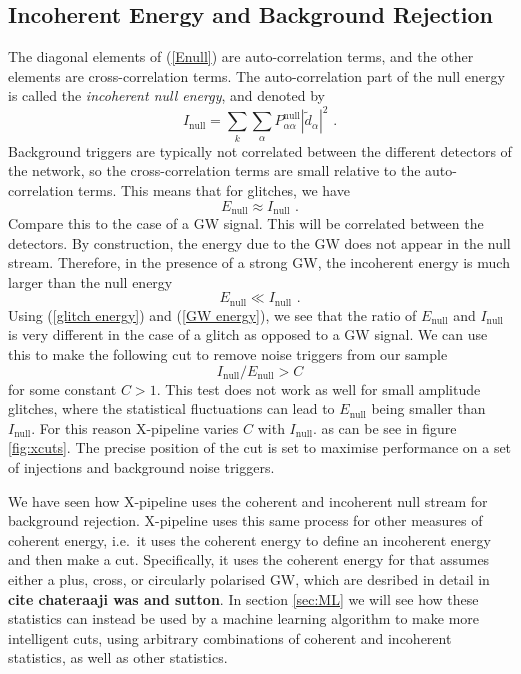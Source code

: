 \documentclass[11pt]{cuthesis}
\newcommand{\fs}{\text{ .}}
\newcommand{\xp}{X-pipeline }
\begin{document}
\subsection{Incoherent Energy and Background Rejection} \label{sec:xcuts}
The diagonal elements of (\ref{Enull}) are auto-correlation terms, and the other elements are cross-correlation terms. The auto-correlation part of the null energy is called the \textit{incoherent null energy}, and denoted by
\begin{equation}
I_\text{null} = \sum_k \sum_\alpha P^\text{null}_{\alpha \alpha} | \tilde{d}_\alpha |^2 \fs
\end{equation}
Background triggers are typically not correlated between the different detectors of the network, so the cross-correlation terms are small relative to the auto-correlation terms. This means that for glitches, we have
\begin{equation} \label{glitch energy}
E_\text{null} \approx I_\text{null} \fs
\end{equation} 
Compare this to the case of a GW signal. This will be correlated between the detectors. By construction, the energy due to the GW does not appear in the null stream. Therefore, in the presence of a strong GW, the incoherent energy is much larger than the null energy 
\begin{equation} \label{GW energy}
E_\text{null} \ll I_\text{null} \fs
\end{equation}
Using (\ref{glitch energy}) and (\ref{GW energy}), we see that the ratio of $E_\text{null}$ and $I_\text{null}$ is very different in the case of a glitch as opposed to a GW signal. We can use this to make the following cut to remove noise triggers from our sample
\begin{equation} \label{cut}
I_\text{null} / E_\text{null} > C
\end{equation}
for some constant $C>1$. This test does not work as well for small amplitude glitches, where the statistical fluctuations can lead to $E_\text{null}$ being smaller than $I_\text{null}$. For this reason \xp varies $C$ with $I_\text{null}$. as can be see in figure \ref{fig:xcuts}. The precise position of the cut is set to maximise performance on a set of injections and background noise triggers.

We have seen how \xp uses the coherent and incoherent null stream for background rejection. \xp uses this same process for other measures of coherent energy, i.e.~it uses the coherent energy to define an incoherent energy and then make a cut. Specifically, it uses the coherent energy for that assumes either a plus, cross, or circularly polarised GW, which are desribed in detail in \textbf{cite chateraaji was and sutton}. In section \ref{sec:ML} we will see how these statistics can instead be used by a machine learning algorithm to make more intelligent cuts, using arbitrary combinations of coherent and incoherent statistics, as well as other statistics. 
\end{document}

